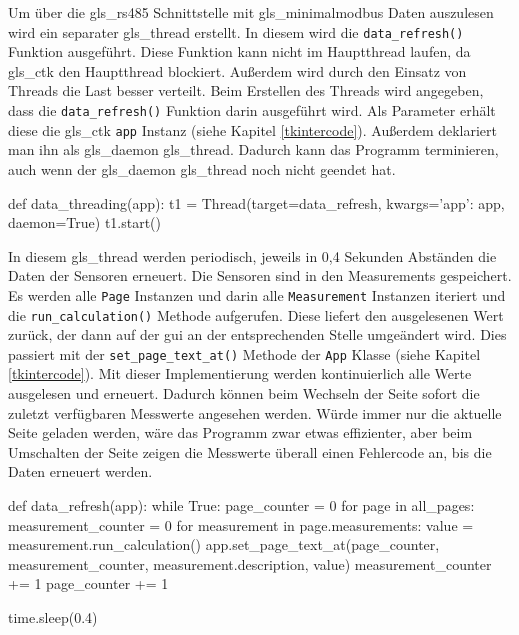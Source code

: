 \label{auslesen_rlt_parameter}

Um über die \gls{gls_rs485} Schnittstelle mit \gls{gls_minimalmodbus} Daten auszulesen wird ein separater \gls{gls_thread} erstellt. In diesem wird die \lstinline{data_refresh()} Funktion ausgeführt. Diese Funktion kann nicht im Hauptthread laufen, da \gls{gls_ctk} den Hauptthread blockiert. Außerdem wird durch den Einsatz von Threads die Last besser verteilt. Beim Erstellen des Threads wird angegeben, dass die \lstinline{data_refresh()} Funktion darin ausgeführt wird. Als Parameter erhält diese die \gls{gls_ctk} \lstinline{app} Instanz (siehe Kapitel \ref{tkintercode}). Außerdem deklariert man ihn als \gls{gls_daemon} \gls{gls_thread}. Dadurch kann das Programm terminieren, auch wenn der \gls{gls_daemon} \gls{gls_thread} noch nicht geendet hat.

\begin{pythoncode}
def data_threading(app):
	t1 = Thread(target=data_refresh, kwargs={'app': app}, daemon=True)
	t1.start()
\end{pythoncode}

In diesem \gls{gls_thread} werden periodisch, jeweils in 0,4 Sekunden Abständen die Daten der Sensoren erneuert. Die Sensoren sind in den Measurements gespeichert. Es werden alle \lstinline{Page} Instanzen und darin alle \lstinline{Measurement} Instanzen iteriert und die \lstinline{run_calculation()} Methode aufgerufen. Diese liefert den ausgelesenen Wert zurück, der dann auf der \acs{gui} an der entsprechenden Stelle umgeändert wird. Dies passiert mit der \lstinline{set_page_text_at()} Methode der \lstinline{App} Klasse (siehe Kapitel \ref{tkintercode}). 
\newline Mit dieser Implementierung werden kontinuierlich alle Werte ausgelesen und erneuert. Dadurch können beim Wechseln der Seite sofort die zuletzt verfügbaren Messwerte angesehen werden. Würde immer nur die aktuelle Seite geladen werden, wäre das Programm zwar etwas effizienter, aber beim Umschalten der Seite zeigen die Messwerte überall einen Fehlercode an, bis die Daten erneuert werden. 

\begin{pythoncode}
def data_refresh(app):
	while True:
		page_counter = 0
		for page in all_pages:
			measurement_counter = 0
			for measurement in page.measurements:
				value = measurement.run_calculation()
				app.set_page_text_at(page_counter, measurement_counter, measurement.description, value)
				measurement_counter += 1
			page_counter += 1
		
		time.sleep(0.4)
\end{pythoncode}

